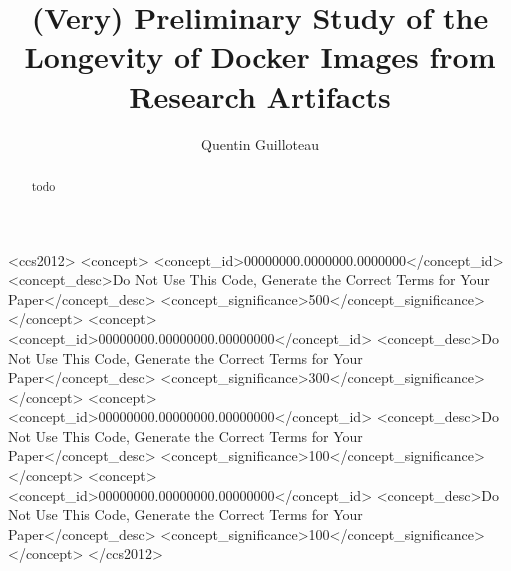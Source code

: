 \documentclass[sigconf,natbib=false]{acmart}
\begin{document}
\title{%
  (Very) Preliminary Study of the Longevity of Docker Images from Research Artifacts
}

\author{Quentin Guilloteau}


\begin{abstract}
  todo
\end{abstract}

\begin{CCSXML}
<ccs2012>
 <concept>
  <concept_id>00000000.0000000.0000000</concept_id>
  <concept_desc>Do Not Use This Code, Generate the Correct Terms for Your Paper</concept_desc>
  <concept_significance>500</concept_significance>
 </concept>
 <concept>
  <concept_id>00000000.00000000.00000000</concept_id>
  <concept_desc>Do Not Use This Code, Generate the Correct Terms for Your Paper</concept_desc>
  <concept_significance>300</concept_significance>
 </concept>
 <concept>
  <concept_id>00000000.00000000.00000000</concept_id>
  <concept_desc>Do Not Use This Code, Generate the Correct Terms for Your Paper</concept_desc>
  <concept_significance>100</concept_significance>
 </concept>
 <concept>
  <concept_id>00000000.00000000.00000000</concept_id>
  <concept_desc>Do Not Use This Code, Generate the Correct Terms for Your Paper</concept_desc>
  <concept_significance>100</concept_significance>
 </concept>
</ccs2012>
\end{CCSXML}




\maketitle
\end{document}
